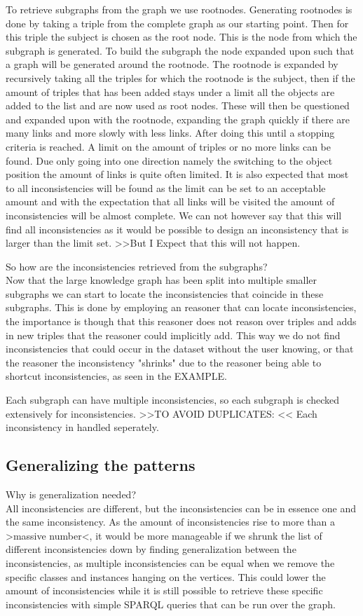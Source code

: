 \documentclass{article}
\begin{document}
To retrieve subgraphs from the graph we use rootnodes. Generating rootnodes is done by taking a triple from the complete graph as our starting point. Then for this triple the subject is chosen as the root node. This is the node from which the subgraph is generated. To build the subgraph the node expanded upon such that a graph will be generated around the rootnode. 
The rootnode is expanded by recursively taking all the triples for which the rootnode is the subject, then if the amount of triples that has been added stays under a limit all the objects are added to the list and are now used as root nodes. These will then be questioned and expanded upon with the rootnode, expanding the graph quickly if there are many links and more slowly with less links. After doing this until a stopping criteria is reached. A limit on the amount of triples or no more links can be found. Due only going into one direction namely the switching to the object position the amount of links is quite often limited. 
It is also expected that most to all inconsistencies will be found as the limit can be set to an acceptable amount and with the expectation that all links will be visited the amount of inconsistencies will be almost complete. We can not however say that this will find all inconsistencies as it would be possible to design an inconsistency that is larger than the limit set. >>But I Expect that this will not happen.

So how are the inconsistencies retrieved from the subgraphs?\\
Now that the large knowledge graph has been split into multiple smaller subgraphs we can start to locate the inconsistencies that coincide in these subgraphs. This is done by employing an reasoner that can locate inconsistencies, the importance is though that this reasoner does not reason over triples and adds in new triples that the reasoner could implicitly add. This way we do not find inconsistencies that could occur in the dataset without the user knowing, or that the reasoner the inconsistency "shrinks" due to the reasoner being able to shortcut inconsistencies, as seen in the EXAMPLE.

Each subgraph can have multiple inconsistencies, so each subgraph is checked extensively for inconsistencies.  >>TO AVOID DUPLICATES: << Each inconsistency in handled seperately.


\subsection{Generalizing the patterns}
Why is generalization needed?\\
All inconsistencies are different, but the inconsistencies can be in essence one and the same inconsistency. As the amount of inconsistencies rise to more than a >massive number<, it would be more manageable if we shrunk the list of different inconsistencies down by finding generalization between the inconsistencies, as multiple inconsistencies can be equal when we remove the specific classes and instances hanging on the vertices. This could lower the amount of inconsistencies while it is still possible to retrieve these specific inconsistencies with simple SPARQL queries that can be run over the graph. 
\end{document}
